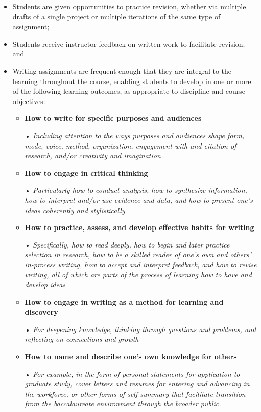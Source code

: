 \documentclass[
  letterpaper,
]{scrbook}
\begin{document}
\begin{itemize}
\item
  Students are given opportunities to practice revision, whether via
  multiple drafts of a single project or multiple iterations of the same
  type of assignment;
\item
  Students receive instructor feedback on written work to facilitate
  revision; and
\item
  Writing assignments are frequent enough that they are integral to the
  learning throughout the course, enabling students to develop in one or
  more of the following learning outcomes, as appropriate to discipline
  and course objectives:

  \begin{itemize}
  \item
    \textbf{How to write for specific purposes and audiences}

    • \emph{Including attention to the ways purposes and audiences shape
    form, mode, voice, method, organization, engagement with and
    citation of research, and/or creativity and imagination}
  \item
    \textbf{How to engage in critical thinking}

    • \emph{Particularly how to conduct analysis, how to synthesize
    information, how to interpret and/or use evidence and data, and how
    to present one's ideas coherently and stylistically}
  \item
    \textbf{How to practice, assess, and develop effective habits for
    writing}

    • \emph{Specifically, how to read deeply, how to begin and later
    practice selection in research, how to be a skilled reader of one's
    own and others' in-process writing, how to accept and interpret
    feedback, and how to revise writing, all of which are parts of the
    process of learning how to have and develop ideas}
  \item
    \textbf{How to engage in writing as a method for learning and
    discovery}

    • \emph{For deepening knowledge, thinking through questions and
    problems, and reflecting on connections and growth}
  \item
    \textbf{How to name and describe one's own knowledge for others}

    • \emph{For example, in the form of personal statements for
    application to graduate study, cover letters and resumes for
    entering and advancing in the workforce, or other forms of
    self-summary that facilitate transition from the baccalaureate
    environment through the broader public.}
  \end{itemize}
\end{itemize}
\end{document}

